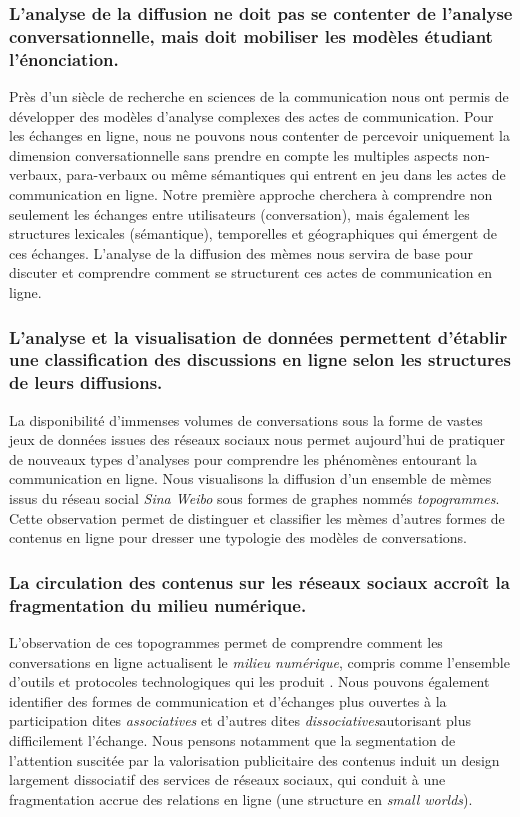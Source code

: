 \subsubsection{L'analyse de la diffusion ne doit pas se contenter de l'analyse conversationnelle, mais doit mobiliser les modèles étudiant l'énonciation.}

Près d'un siècle de recherche en sciences de la communication nous ont permis de développer des modèles d'analyse complexes des actes de communication. Pour les échanges en ligne, nous ne pouvons nous contenter de percevoir uniquement la dimension conversationnelle sans prendre en compte les multiples aspects non-verbaux, para-verbaux ou même sémantiques qui entrent en jeu dans les actes de communication en ligne. Notre première approche cherchera à comprendre non seulement les échanges entre utilisateurs (conversation), mais également les structures lexicales (sémantique), temporelles et géographiques qui émergent de ces échanges. L'analyse de la diffusion des mèmes nous servira de base pour discuter et comprendre comment se structurent ces actes de communication en ligne.


\subsubsection{L'analyse et la visualisation de données permettent d'établir une classification des discussions en ligne selon les structures de leurs diffusions.}

La disponibilité d'immenses volumes de conversations sous la forme de vastes jeux de données issues des réseaux sociaux nous permet aujourd'hui de pratiquer de nouveaux types d'analyses pour comprendre les phénomènes entourant la communication en ligne. Nous visualisons la diffusion d'un ensemble de mèmes issus du réseau social \textit{Sina Weibo} sous formes de graphes nommés \textit{topogrammes}. Cette observation permet de distinguer et classifier les mèmes d'autres formes de contenus en ligne pour dresser une typologie des modèles de conversations.

\subsubsection{La circulation des contenus sur les réseaux sociaux accroît la fragmentation du milieu numérique.}

L{\textquoteright}observation de ces topogrammes permet de comprendre comment les conversations en ligne actualisent le \textit{milieu numérique}, compris comme l{\textquoteright}ensemble d'outils et protocoles technologiques qui les produit \citep{Hui2012}. Nous pouvons également identifier des formes de communication et d'échanges plus ouvertes à la participation dites \textit{associatives} et d{\textquoteright}autres dites \textit{dissociatives}autorisant plus difficilement l{\textquoteright}échange. Nous pensons notamment que la segmentation de l{\textquoteright}attention suscitée par la valorisation publicitaire des contenus induit un design largement dissociatif des services de réseaux sociaux, qui conduit à une fragmentation accrue des relations en ligne (une structure en \textit{small worlds}).

